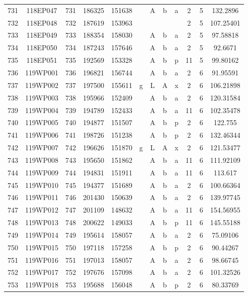 \begin{tabular}{|*{12}{c|}}
731 & 118EP047 & 731 & 186325 & 151638 &  & A & b & a & 2 & 5 & 132.2896 \\ 
732 & 118EP048 & 732 & 187619 & 153963 &  &  &  &  & 2 & 5 & 107.25401 \\ 
733 & 118EP049 & 733 & 188354 & 158030 &  & A & b & a & 2 & 5 & 97.58818 \\ 
734 & 118EP050 & 734 & 187243 & 157646 &  & A & b & a & 2 & 5 & 92.6671 \\ 
735 & 118EP051 & 735 & 192569 & 153328 &  & A & b & p & 11 & 5 & 99.80162 \\ 
736 & 119WP001 & 736 & 196821 & 156744 &  & A & b & a & 2 & 6 & 91.95591 \\ 
737 & 119WP002 & 737 & 197500 & 155611 & g & L & A & x & 2 & 6 & 106.21898 \\ 
738 & 119WP003 & 738 & 195966 & 152409 &  & A & b & a & 2 & 6 & 120.31584 \\ 
739 & 119WP004 & 739 & 194789 & 152433 &  & A & b & a & 11 & 6 & 102.35478 \\ 
740 & 119WP005 & 740 & 194877 & 151507 &  & A & b & p & 2 & 6 & 122.755 \\ 
741 & 119WP006 & 741 & 198726 & 151238 &  & A & b & p & 2 & 6 & 132.46344 \\ 
742 & 119WP007 & 742 & 196626 & 151870 & g & L & A & x & 2 & 6 & 121.53477 \\ 
743 & 119WP008 & 743 & 195650 & 151862 &  & A & b & a & 11 & 6 & 111.92109 \\ 
744 & 119WP009 & 744 & 194831 & 151911 &  & A & b & a & 11 & 6 & 113.617 \\ 
745 & 119WP010 & 745 & 194377 & 151689 &  & A & b & a & 2 & 6 & 100.66364 \\ 
746 & 119WP011 & 746 & 201430 & 150639 &  & A & b & a & 2 & 6 & 139.97745 \\ 
747 & 119WP012 & 747 & 201109 & 148632 &  & A & b & a & 11 & 6 & 154.56955 \\ 
748 & 119WP013 & 748 & 200622 & 149033 &  & A & b & p & 11 & 6 & 145.55188 \\ 
749 & 119WP014 & 749 & 195614 & 158057 &  & A & b & a & 2 & 6 & 75.09106 \\ 
750 & 119WP015 & 750 & 197118 & 157258 &  & A & b & p & 2 & 6 & 90.44267 \\ 
751 & 119WP016 & 751 & 197013 & 158057 &  & A & b & a & 2 & 6 & 98.66745 \\ 
752 & 119WP017 & 752 & 197676 & 157098 &  & A & b & a & 2 & 6 & 101.32526 \\ 
753 & 119WP018 & 753 & 195688 & 156048 &  & A & b & p & 2 & 6 & 80.33769 \\ 

\end{tabular}
